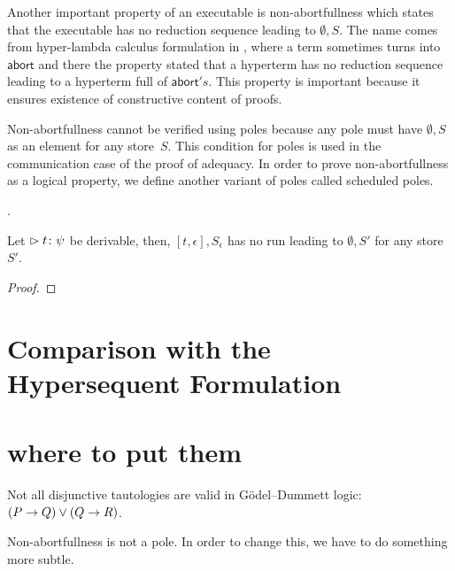 Another important property of an executable is
non-abortfullness
which states that the executable has no reduction sequence leading to
$\emptyset,S$.
The name comes from hyper-lambda calculus formulation in ,
where a term sometimes turns into $\mathsf{abort}$ and there the property
stated that a hyperterm has no reduction sequence leading to a hyperterm
full of $\mathsf{abort}'s$.
This property is important because it ensures existence of
constructive content of proofs.

Non-abortfullness cannot be verified using poles
because any pole must have $\emptyset,S$ as an element for
any store~$S$.
This condition for poles is used in the
communication case of the proof of adequacy.
In order to prove non-abortfullness as a logical property,
we define another variant of poles called scheduled poles.


.


\newcommand{\sche}{\sqsubseteq}

\begin{proposition}
Let $\vartriangleright{t} \colon{\psi}$ be derivable, then,
 $[t,\epsilon], S_\epsilon$ has no run leading to $\emptyset, S'$ for
 any store $S'$.
\end{proposition}
\begin{proof}
\end{proof}



\section{Comparison with the Hypersequent Formulation}


\section*{where to put them}

Not all disjunctive tautologies are valid in G\"odel--Dummett logic:
$(P\rightarrow Q)\lor(Q\rightarrow R)$.

Non-abortfullness is not a pole.
In order to change this, we have to do something more subtle.

